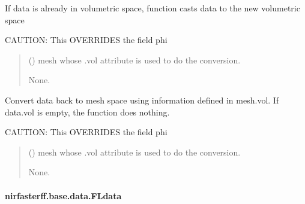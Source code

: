 \documentclass[letterpaper,10pt,english]{sphinxmanual}
\begin{document}
\begin{fulllineitems}
\begin{fulllineitems}
\sphinxAtStartPar
If data is already in volumetric space, function casts data to the new volumetric space

\sphinxAtStartPar
CAUTION: This OVERRIDES the field phi
\begin{quote}\begin{description}
\sphinxAtStartPar
{} () \textendash{} mesh whose .vol attribute is used to do the conversion.

\sphinxAtStartPar
None.

\end{description}\end{quote}

\end{fulllineitems}


\begin{fulllineitems}
\label{\detokenize{_autosummary/nirfasterff.base.data.FDdata:nirfasterff.base.data.FDdata.tomesh}}
\pysigstartsignatures
\pysiglinewithargsret
{}
{}
{}
\pysigstopsignatures
\sphinxAtStartPar
Convert data back to mesh space using information defined in mesh.vol. If data.vol is empty, the function does nothing.

\sphinxAtStartPar
CAUTION: This OVERRIDES the field phi
\begin{quote}\begin{description}
\sphinxAtStartPar
{} () \textendash{} mesh whose .vol attribute is used to do the conversion.

\sphinxAtStartPar
None.

\end{description}\end{quote}

\end{fulllineitems}


\end{fulllineitems}


\sphinxstepscope


\paragraph{nirfasterff.base.data.FLdata}
\label{\detokenize{_autosummary/nirfasterff.base.data.FLdata:nirfasterff-base-data-fldata}}\label{\detokenize{_autosummary/nirfasterff.base.data.FLdata::doc}}
\end{document}
